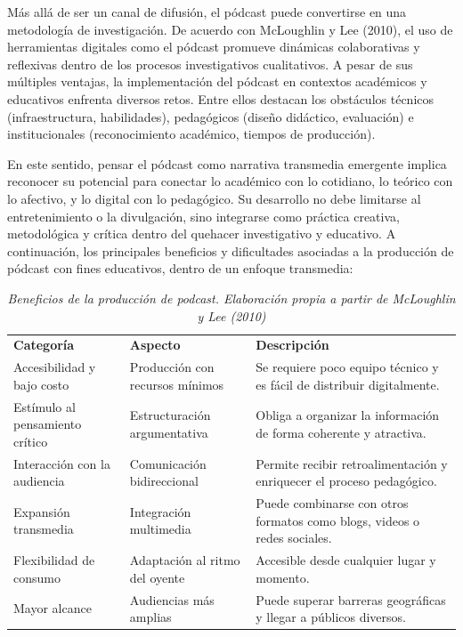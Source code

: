 \documentclass[
]{interact}
\begin{document}
Más allá de ser un canal de difusión, el pódcast puede convertirse en
una metodología de investigación. De acuerdo con McLoughlin y Lee
(2010), el uso de herramientas digitales como el pódcast promueve
dinámicas colaborativas y reflexivas dentro de los procesos
investigativos cualitativos. A pesar de sus múltiples ventajas, la
implementación del pódcast en contextos académicos y educativos enfrenta
diversos retos. Entre ellos destacan los obstáculos técnicos
(infraestructura, habilidades), pedagógicos (diseño didáctico,
evaluación) e institucionales (reconocimiento académico, tiempos de
producción).

En este sentido, pensar el pódcast como narrativa transmedia emergente
implica reconocer su potencial para conectar lo académico con lo
cotidiano, lo teórico con lo afectivo, y lo digital con lo pedagógico.
Su desarrollo no debe limitarse al entretenimiento o la divulgación,
sino integrarse como práctica creativa, metodológica y crítica dentro
del quehacer investigativo y educativo. A continuación, los principales
beneficios y dificultades asociadas a la producción de pódcast con fines
educativos, dentro de un enfoque transmedia:

\newpage

\begin{longtable}[]{@{}
  >{\raggedright\arraybackslash}p{}
  >{\raggedright\arraybackslash}p{}
  >{\raggedright\arraybackslash}p{}@{}}
\caption{\emph{Beneficios de la producción de podcast. Elaboración
propia a partir de McLoughlin y Lee (2010)}}\tabularnewline
\toprule\noalign{}
\endfirsthead
\endhead
\bottomrule\noalign{}
\endlastfoot
\textbf{Categoría} & \textbf{Aspecto} & \textbf{Descripción} \\
Accesibilidad y bajo costo & Producción con recursos mínimos & Se
requiere poco equipo técnico y es fácil de distribuir digitalmente. \\
Estímulo al pensamiento crítico & Estructuración argumentativa & Obliga
a organizar la información de forma coherente y atractiva. \\
Interacción con la audiencia & Comunicación bidireccional & Permite
recibir retroalimentación y enriquecer el proceso pedagógico. \\
Expansión transmedia & Integración multimedia & Puede combinarse con
otros formatos como blogs, videos o redes sociales. \\
Flexibilidad de consumo & Adaptación al ritmo del oyente & Accesible
desde cualquier lugar y momento. \\
Mayor alcance & Audiencias más amplias & Puede superar barreras
geográficas y llegar a públicos diversos. \\
\end{longtable}
\end{document}
